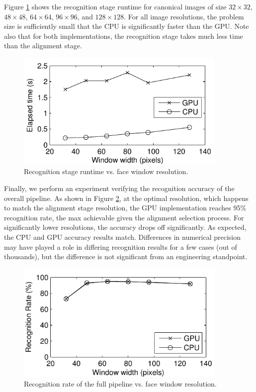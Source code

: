 Figure \ref{fig:recognition_stage_runtime} shows the recognition stage runtime
for canonical images of size $32\times32$, $48 \times 48$, $64 \times 64$, $96 \times
96$, and $128 \times 128$.  For all image resolutions, the problem size
is sufficiently small that the CPU is significantly faster than the GPU.  Note
also that for both implementations, the recognition stage takes much less time
than the alignment stage.
\begin{figure}[t!]
\centering
\includegraphics[width=4in]{figures_ijcb/speedVsResolution.pdf} 
\caption{Recognition stage runtime vs. face window resolution.}
\label{fig:recognition_stage_runtime} \end{figure}

Finally, we perform an experiment verifying the recognition accuracy of the
overall pipeline.  As shown in Figure \ref{fig:accuracy_vs_resolution},
at the optimal resolution, which happens to match the alignment stage
resolution, the GPU implementation reaches 95\% recognition rate, the max
achievable given the alignment selection process.  For significantly lower resolutions,
the accuracy drops off significantly.  As expected, the CPU and GPU accuracy results match.
Differences in numerical precision may have played a role in differing recognition
results for a few cases (out of thousands), but the difference is not significant from
an engineering standpoint.
\begin{figure}[t!]
\centering
\includegraphics[width=4in]{figures_ijcb/accuracyVsResolution.pdf} 
\caption{Recognition rate of the full pipeline vs. face window resolution.} 
\label{fig:accuracy_vs_resolution}
\end{figure}

